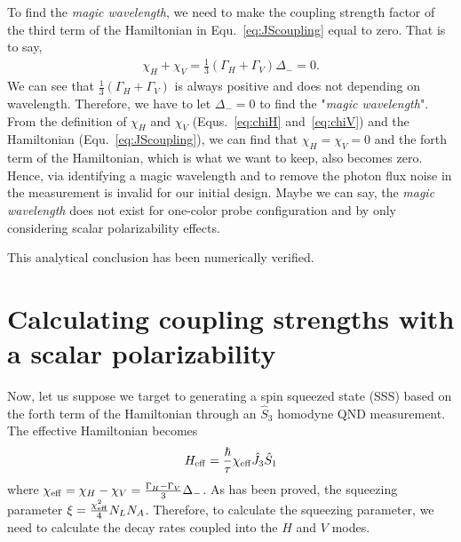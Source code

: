 To find the \emph{magic wavelength}, we need to make the coupling strength factor of the third term of the Hamiltonian in Equ.~\eqref{eq:JScoupling} equal to zero. That is to say,
\begin{align}
\chi_H+\chi_V=\frac{1}{3}\left(\Gamma_H + \Gamma_V \right)\Delta_- = 0.
\end{align}
We can see that $ \frac{1}{3}\left(\Gamma_H + \Gamma_V \right) $ is always positive and does not 
depending on wavelength. Therefore, we have to let $ \Delta_-=0 $ to find the "\textit{magic 
wavelength}". From the definition of $ \chi_H $ and $ \chi_V $ 
(Equs.~\eqref{eq:chiH} and~\eqref{eq:chiV}) and the Hamiltonian (Equ.~\eqref{eq:JScoupling}), we can 
find that $ \chi_H=\chi_V=0 $ and the forth term of the Hamiltonian, which is what we want to keep, also 
becomes zero. Hence, via identifying a magic wavelength and to remove the photon flux noise in the 
measurement is invalid for our initial design. Maybe we can say, the \emph{magic wavelength} does not 
exist for one-color probe configuration and by only considering scalar polarizability effects. 

This analytical conclusion has been numerically verified. 

\section{Calculating coupling strengths with a scalar polarizability}
Now, let us suppose we target to generating a spin squeezed state (SSS) based on the forth term of the Hamiltonian through an $ \hat{S}_3 $ homodyne QND measurement. The effective Hamiltonian becomes
\begin{align}
	H_{\rm eff} = \frac{\hbar}{\tau} \chi_{\rm eff} \hat{J}_3 \hat{S}_1
\end{align}
where $\chi_{\rm eff} = \chi_{H} - \chi_{V}=\frac{\Gamma_H-\Gamma_V}{3}\Delta_-$. As has been proved, the squeezing parameter $ \xi =\frac{\chi_{\rm eff}^2 }{4}N_LN_A $. Therefore, to calculate the squeezing parameter, we need to calculate the decay rates coupled into the $ H $ and $ V $ modes. 

